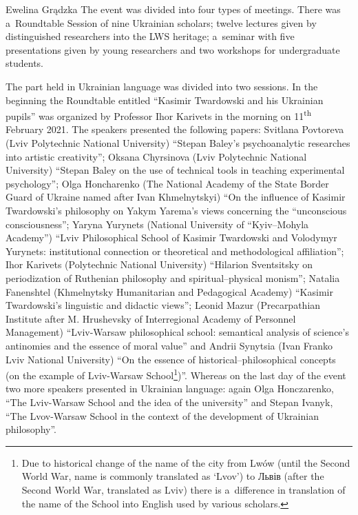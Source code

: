 \begin{editorialeng}{Ewelina Grądzka}
The event was divided into four types of meetings. There was a~Roundtable Session of nine Ukrainian scholars; twelve lectures given by distinguished researchers into the LWS heritage; a~seminar with five presentations given by young researchers and two workshops for undergraduate students.

The part held in Ukrainian language was divided into two sessions. In the beginning the Roundtable entitled ``Kasimir Twardowski and his Ukrainian pupils'' was organized by Professor Ihor Karivets in the morning on 11\textsuperscript{th} February 2021. The speakers presented the following papers: Svitlana Povtoreva (Lviv Polytechnic National University) ``Stepan Baley’s psychoanalytic researches into artistic creativity''; Oksana Chyrsinova (Lviv Polytechnic National University) ``Stepan Baley on the use of technical tools in teaching experimental psychology''; Olga Honcharenko (The National Academy of the State Border Guard of Ukraine named after Ivan Khmelnytskyi) ``On the influence of Kasimir Twardowski’s philosophy on Yakym Yarema’s views concerning the ``unconscious consciousness''; Yaryna Yurynets (National University of ``Kyiv--Mohyla Academy'') ``Lviv Philosophical School of Kasimir Twardowski and Volodymyr Yurynets: institutional connection or theoretical and methodological affiliation''; Ihor Karivets (Polytechnic National University) ``Hilarion Sventsitsky on periodization of Ruthenian philosophy and spiritual--physical monism''; Natalia Fanenshtel (Khmelnytsky Humanitarian and Pedagogical Academy) ``Kasimir Twardowski’s linguistic and didactic views''; Leonid Mazur (Precarpathian Institute after M. Hrushevsky of Interregional Academy of Personnel Management) ``Lviv-Warsaw philosophical school: semantical analysis of science’s antinomies and the essence of moral value'' and Andrii Synytsia (Ivan Franko Lviv National University) ``On the essence of historical--philosophical concepts (on the example of Lviv-Warsaw School\footnote{Due to historical change of the name of the city from Lwów (until the Second World War, name is commonly translated as ‘Lvov’) to \foreignlanguage{russian}{Львів} (after the Second World War, translated as Lviv) there is a~difference in translation of the name of the School into English used by various scholars. })''. Whereas on the last day of the event two more speakers presented in Ukrainian language: again Olga Honczarenko, ``The Lviv-Warsaw School and the idea of the university'' and Stepan Ivanyk, ``The Lvov-Warsaw School in the context of the development of Ukrainian philosophy''.


\end{editorialeng}
